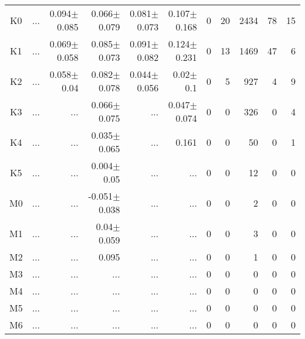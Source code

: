 \begin{table}[t]
\begin{center}
\begin{tabular}{c|rrrrr|rrrrr}
K0	&	 ...	&	0.094$\pm$0.085	&	0.066$\pm$0.079	&	0.081$\pm$0.073	&	0.107$\pm$0.168	&	0	&	20	&	2434	&	78	&	15	\\
K1	&	 ...	&	0.069$\pm$0.058	&	0.085$\pm$0.073	&	0.091$\pm$0.082	&	0.124$\pm$0.231	&	0	&	13	&	1469	&	47	&	6	\\
K2	&	 ...	&	0.058$\pm$0.04	&	0.082$\pm$0.078	&	0.044$\pm$0.056	&	0.02$\pm$0.1	&	0	&	5	&	927	&	4	&	9	\\
K3	&	 ...	&	 ...	&	0.066$\pm$0.075	&	 ...	&	0.047$\pm$0.074	&	0	&	0	&	326	&	0	&	4	\\
K4	&	 ...	&	 ...	&	0.035$\pm$0.065	&	 ...	&	0.161	&	0	&	0	&	50	&	0	&	1	\\
K5	&	 ...	&	 ...	&	0.004$\pm$0.05	&	 ...	&	 ...	&	0	&	0	&	12	&	0	&	0	\\
M0	&	 ...	&	 ...	&	-0.051$\pm$0.038	&	 ...	&	 ...	&	0	&	0	&	2	&	0	&	0	\\
M1	&	 ...	&	 ...	&	0.04$\pm$0.059	&	 ...	&	 ...	&	0	&	0	&	3	&	0	&	0	\\
M2	&	 ...	&	 ...	&	0.095	&	 ...	&	 ...	&	0	&	0	&	1	&	0	&	0	\\
M3	&	 ...	&	 ...	&	 ...	&	 ...	&	 ...	&	0	&	0	&	0	&	0	&	0	\\
M4	&	 ...	&	 ...	&	 ...	&	 ...	&	 ...	&	0	&	0	&	0	&	0	&	0	\\
M5	&	 ...	&	 ...	&	 ...	&	 ...	&	 ...	&	0	&	0	&	0	&	0	&	0	\\
M6	&	 ...	&	 ...	&	 ...	&	 ...	&	 ...	&	0	&	0	&	0	&	0	&	0	\\
    \bottomrule
    \end{tabular}
\end{center}
\end{table}
